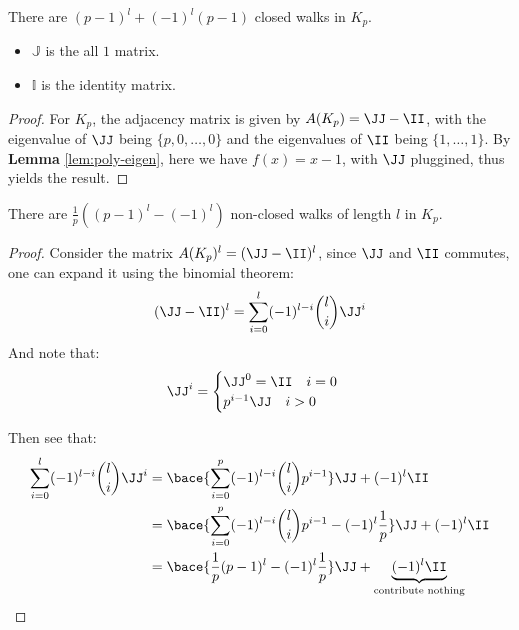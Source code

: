\begin{corollary}
	There are \( (p-1)^l + (-1)^l (p-1) \) closed walks in \( K_p \).
\end{corollary}

\begin{notation}
	\leavevmode
	\begin{itemize}
		\item \( \mathbb J \) is the all \( 1 \) matrix.
		\item \( \mathbb I \) is the identity matrix.
	\end{itemize}
\end{notation}

\begin{proof}
	For \( K_p \), the adjacency matrix is given by \( A(K_p) = \JJ - \II \), with the eigenvalue of \( \JJ \) being \( \{p, 0, \ldots, 0\} \) and the eigenvalues of \( \II \) being \( \{1, \ldots, 1\} \). By \textbf{Lemma} \ref{lem:poly-eigen}, here we have \( f(x) = x - 1 \), with \( \JJ \) pluggined, thus yields the result.
\end{proof}

\begin{corollary}
	There are \( \frac{1}{p}((p-1)^l - (-1)^l) \) non-closed walks of length \( l \) in \( K_p \).
\end{corollary}

\begin{proof}
	Consider the matrix \( A(K_p)^l = (\JJ - \II)^l \), since \( \JJ \) and \( \II \) commutes, one can expand it using the binomial theorem:
	\[
		(\JJ - \II)^l = \sum_{i=0}^l (-1)^{l-i}\binom{l}{i} \JJ^i
	\]
	And note that:
	\[
		\JJ^i =
		\begin{cases}
			\JJ^0 = \II \quad i=0 \\
			p^{i-1} \JJ \quad i > 0
		\end{cases}
	\]

	Then see that:
	\[
		\begin{aligned}
			\sum_{i=0}^l (-1)^{l-i}\binom{l}{i} \JJ^i & = \bace{\sum_{i=0}^p (-1)^{l-i}\binom{l}{i}p^{i-1}} \JJ + (-1)^l \II                                       \\
			                                          & = \bace{\sum_{i=0}^p (-1)^{l-i}\binom{l}{i}p^{i-1} - (-1)^l \frac{1}{p}} \JJ + (-1)^l \II                  \\
			                                          & = \bace{\frac{1}{p}(p-1)^l - (-1)^l \frac{1}{p}} \JJ + \underbrace{(-1)^l \II}_{\text{contribute nothing}}
		\end{aligned}
	\]
\end{proof}

